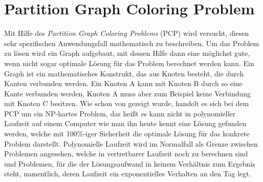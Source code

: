 \section{Partition Graph Coloring Problem}
Mit Hilfe des \textit{Partition Graph Coloring Problems} (PCP) wird versucht, diesen sehr spezifischen Anwendungsfall mathematisch zu beschreiben. Um das Problem zu lösen wird ein Graph aufgebaut, mit dessen Hilfe dann eine möglichst gute, wenn nicht sogar optimale Lösung für das Problem berechnet werden kann. Ein Graph ist ein mathematisches Konstrukt, das aus Knoten besteht, die durch Kanten verbunden werden. Ein Knoten A kann mit Knoten B durch so eine Kante verbunden werden, Knoten A muss aber zum Beispiel keine Verbindung mit Knoten C besitzen. Wie schon von \citet*{Li2000} gezeigt wurde, handelt es sich bei dem PCP um ein NP-hartes Problem, das heißt es kann nicht in polynomieller Laufzeit auf einem Computer wie man ihn heute kennt eine Lösung gefunden werden, welche mit 100\%-iger Sicherheit die optimale Lösung für das konkrete Problem darstellt. Polynomielle Laufzeit wird im Normalfall als Grenze zwischen Problemen angesehen, welche in vertretbarer Laufzeit noch zu berechnen sind und Problemen, für die der Lösungsaufwand in keinem Verhältnis zum Ergebnis steht, namentlich, deren Laufzeit ein exponentielles Verhalten an den Tag legt.

